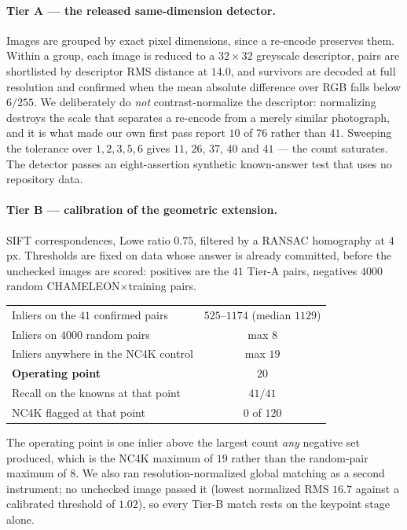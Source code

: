 \documentclass{article}
\begin{document}
\paragraph{Tier A --- the released same-dimension detector.} Images are grouped by exact pixel
dimensions, since a re-encode preserves them. Within a group, each image is reduced to a
$32\times32$ greyscale descriptor, pairs are shortlisted by descriptor RMS distance at $14.0$, and
survivors are decoded at full resolution and confirmed when the mean absolute difference over RGB
falls below $6/255$. We deliberately do \emph{not} contrast-normalize the descriptor: normalizing
destroys the scale that separates a re-encode from a merely similar photograph, and it is what made
our own first pass report $10$ of $76$ rather than $41$. Sweeping the tolerance over
$1, 2, 3, 5, 6$ gives $11$, $26$, $37$, $40$ and $41$ --- the count saturates. The detector passes an
eight-assertion synthetic known-answer test that uses no repository data.

\paragraph{Tier B --- calibration of the geometric extension.} SIFT correspondences, Lowe ratio
$0.75$, filtered by a RANSAC homography at $4$ px. Thresholds are fixed on data whose answer is
already committed, before the unchecked images are scored: positives are the $41$ Tier-A pairs,
negatives $4000$ random CHAMELEON$\times$training pairs.

\begin{center}\small
\begin{tabular}{lc}
\toprule
Inliers on the $41$ confirmed pairs & $525$--$1174$ (median $1129$) \\
Inliers on $4000$ random pairs & max $8$ \\
Inliers anywhere in the NC4K control & max $19$ \\
\textbf{Operating point} & \textbf{$20$} \\
Recall on the knowns at that point & $41/41$ \\
NC4K flagged at that point & $0$ of $120$ \\
\bottomrule
\end{tabular}
\end{center}

The operating point is one inlier above the largest count \emph{any} negative set produced, which is
the NC4K maximum of $19$ rather than the random-pair maximum of $8$. We also ran resolution-normalized
global matching as a second instrument; no unchecked image passed it (lowest normalized RMS $16.7$
against a calibrated threshold of $1.02$), so every Tier-B match rests on the keypoint stage alone.
\end{document}
